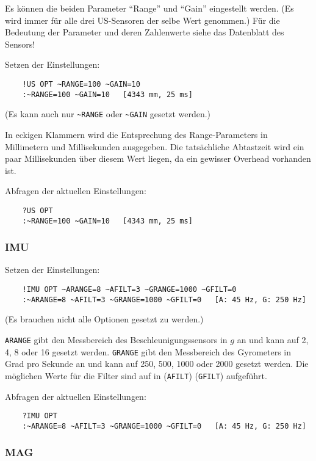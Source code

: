 Es können die beiden Parameter "`Range"' und "`Gain"' eingestellt werden. (Es wird immer für alle drei US-Sensoren der selbe Wert genommen.) Für die Bedeutung der Parameter und deren Zahlenwerte siehe das Datenblatt des Sensors!

Setzen der Einstellungen:
\begin{verbatim}
	!US OPT ~RANGE=100 ~GAIN=10
	:~RANGE=100 ~GAIN=10   [4343 mm, 25 ms]
\end{verbatim}
(Es kann auch nur \verb|~RANGE| oder \verb|~GAIN| gesetzt werden.)

In eckigen Klammern wird die Entsprechung des Range-Parameters in Millimetern und Millisekunden ausgegeben. Die tatsächliche Abtastzeit wird ein paar Millisekunden über diesem Wert liegen, da ein gewisser Overhead vorhanden ist.

Abfragen der aktuellen Einstellungen:
\begin{verbatim}
	?US OPT
	:~RANGE=100 ~GAIN=10   [4343 mm, 25 ms]
\end{verbatim}



\subsubsection{IMU}

Setzen der Einstellungen:
\begin{verbatim}
	!IMU OPT ~ARANGE=8 ~AFILT=3 ~GRANGE=1000 ~GFILT=0
	:~ARANGE=8 ~AFILT=3 ~GRANGE=1000 ~GFILT=0   [A: 45 Hz, G: 250 Hz]
\end{verbatim}
(Es brauchen nicht alle Optionen gesetzt zu werden.)

\verb|ARANGE| gibt den Messbereich des Beschleunigungssensors in $g$ an und kann auf 2, 4, 8 oder 16 gesetzt werden. \verb|GRANGE| gibt den Messbereich des Gyrometers in Grad pro Sekunde an und kann auf 250, 500, 1000 oder 2000 gesetzt werden. Die möglichen Werte für die Filter sind auf  in  (\verb|AFILT|) \bzw {} (\verb|GFILT|) aufgeführt.


Abfragen der aktuellen Einstellungen:
\begin{verbatim}
	?IMU OPT
	:~ARANGE=8 ~AFILT=3 ~GRANGE=1000 ~GFILT=0   [A: 45 Hz, G: 250 Hz]
\end{verbatim}




\subsubsection{MAG}

